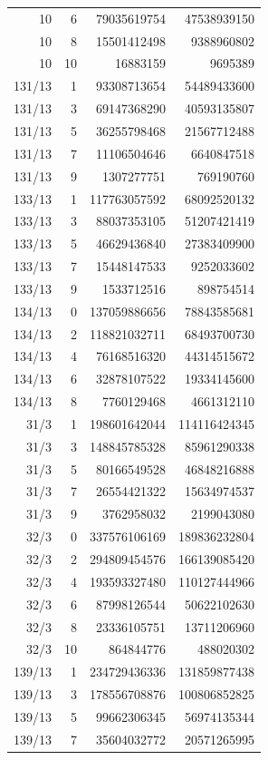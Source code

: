 \begin{longtable}{@{}rrrr@{}}
10 & 6 & 79035619754 & 47538939150\\
10 & 8 & 15501412498 & 9388960802\\
10 & 10 & 16883159 & 9695389\\
131/13 & 1 & 93308713654 & 54489433600\\
131/13 & 3 & 69147368290 & 40593135807\\
131/13 & 5 & 36255798468 & 21567712488\\
131/13 & 7 & 11106504646 & 6640847518\\
131/13 & 9 & 1307277751 & 769190760\\
133/13 & 1 & 117763057592 & 68092520132\\
133/13 & 3 & 88037353105 & 51207421419\\
133/13 & 5 & 46629436840 & 27383409900\\
133/13 & 7 & 15448147533 & 9252033602\\
133/13 & 9 & 1533712516 & 898754514\\
134/13 & 0 & 137059886656 & 78843585681\\
134/13 & 2 & 118821032711 & 68493700730\\
134/13 & 4 & 76168516320 & 44314515672\\
134/13 & 6 & 32878107522 & 19334145600\\
134/13 & 8 & 7760129468 & 4661312110\\
31/3 & 1 & 198601642044 & 114116424345\\
31/3 & 3 & 148845785328 & 85961290338\\
31/3 & 5 & 80166549528 & 46848216888\\
31/3 & 7 & 26554421322 & 15634974537\\
31/3 & 9 & 3762958032 & 2199043080\\
32/3 & 0 & 337576106169 & 189836232804\\
32/3 & 2 & 294809454576 & 166139085420\\
32/3 & 4 & 193593327480 & 110127444966\\
32/3 & 6 & 87998126544 & 50622102630\\
32/3 & 8 & 23336105751 & 13711206960\\
32/3 & 10 & 864844776 & 488020302\\
139/13 & 1 & 234729436336 & 131859877438\\
139/13 & 3 & 178556708876 & 100806852825\\
139/13 & 5 & 99662306345 & 56974135344\\
139/13 & 7 & 35604032772 & 20571265995\\

\end{longtable}

